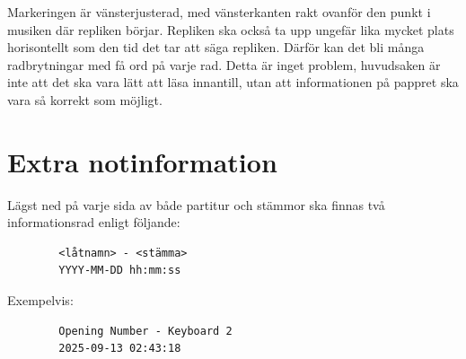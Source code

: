 Markeringen är vänsterjusterad, med vänsterkanten rakt ovanför den punkt i musiken där repliken börjar. Repliken ska också ta upp ungefär lika mycket plats horisontellt som den tid det tar att säga repliken. Därför kan det bli många radbrytningar med få ord på varje rad. Detta är inget problem, huvudsaken är inte att det ska vara lätt att läsa innantill, utan att informationen på pappret ska vara så korrekt som möjligt.

\newpage
\section{Extra notinformation}
Lägst ned på varje sida av både partitur och stämmor ska finnas två informationsrad enligt följande:
\begin{center}
    \begin{verbatim}
        <låtnamn> - <stämma>
        YYYY-MM-DD hh:mm:ss
    \end{verbatim}
\end{center}
Exempelvis:
\begin{center}
    \begin{verbatim}
        Opening Number - Keyboard 2
        2025-09-13 02:43:18
    \end{verbatim}
\end{center}
